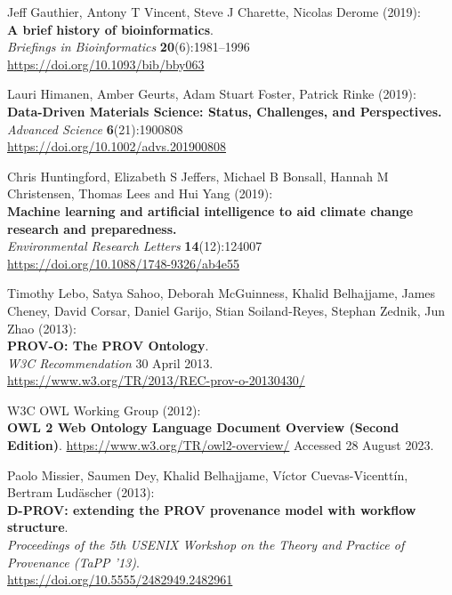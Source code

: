 \documentclass[10pt,letterpaper]{article}
\begin{document}
\begin{thebibliography}{10}
\begin{small}
Jeff Gauthier, Antony T Vincent, Steve J Charette, Nicolas Derome (2019):\\
\textbf{A brief history of bioinformatics}.\\
\emph{Briefings in Bioinformatics} \textbf{20}(6):1981--1996\\
\url{https://doi.org/10.1093/bib/bby063}

Lauri Himanen, Amber Geurts, Adam Stuart Foster, Patrick Rinke (2019):\\
\textbf{Data-Driven Materials Science: Status, Challenges, and Perspectives.}\\
\emph{Advanced Science} \textbf{6}(21):1900808\\
\url{https://doi.org/10.1002/advs.201900808}


 Chris Huntingford, Elizabeth S Jeffers, Michael B Bonsall, Hannah M Christensen, Thomas Lees and Hui Yang (2019):\\
\textbf{Machine learning and artificial intelligence to aid climate change research and preparedness.}\\
\emph{Environmental Research Letters} \textbf{14}(12):124007\\
\url{https://doi.org/10.1088/1748-9326/ab4e55}

 Timothy Lebo, Satya Sahoo, Deborah McGuinness, Khalid
Belhajjame, James Cheney, David Corsar, Daniel Garijo, Stian
Soiland-Reyes, Stephan Zednik, Jun Zhao (2013):\\
\textbf{PROV-O: The PROV Ontology}.\\
\emph{W3C Recommendation} 30 April 2013.\\
\url{https://www.w3.org/TR/2013/REC-prov-o-20130430/}

W3C OWL Working Group (2012):\\
\textbf{OWL 2 Web Ontology Language Document Overview (Second Edition)}.
\url{https://www.w3.org/TR/owl2-overview/}
Accessed 28 August 2023.

Paolo Missier, Saumen Dey, Khalid Belhajjame, Víctor Cuevas-Vicenttín, Bertram Ludäscher (2013):\\
\textbf{D-PROV: extending the PROV provenance model with workflow structure}.\\
\emph{Proceedings of the 5th USENIX Workshop on the Theory and Practice of Provenance (TaPP '13)}. \\
\url{https://doi.org/10.5555/2482949.2482961}


\end{small}
\end{thebibliography}
\end{document}
